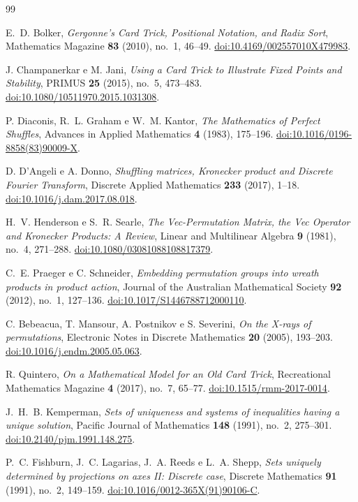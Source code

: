 	\begin{thebibliography}{99}

		E.~D. Bolker,
		\emph{Gergonne's Card Trick, Positional Notation, and Radix Sort},
		Mathematics Magazine \textbf{83} (2010), no.~1, 46--49.
		\href{https://doi.org/10.4169/002557010X479983}{doi:10.4169/002557010X479983}.

		J. Champanerkar e M. Jani,
		\emph{Using a Card Trick to Illustrate Fixed Points and Stability},
		PRIMUS \textbf{25} (2015), no.~5, 473--483.
		\href{https://doi.org/10.1080/10511970.2015.1031308}{doi:10.1080/10511970.2015.1031308}.

		P. Diaconis, R.~L. Graham e W.~M. Kantor,
		\emph{The Mathematics of Perfect Shuffles},
		Advances in Applied Mathematics \textbf{4} (1983), 175--196.
		\href{https://doi.org/10.1016/0196-8858(83)90009-X}{doi:10.1016/0196-8858(83)90009-X}.

		D. D'Angeli e A. Donno,
		\emph{Shuffling matrices, Kronecker product and Discrete Fourier Transform},
		Discrete Applied Mathematics \textbf{233} (2017), 1--18.
		\href{https://doi.org/10.1016/j.dam.2017.08.018}{doi:10.1016/j.dam.2017.08.018}.

		H.~V. Henderson e S.~R. Searle,
		\emph{The Vec-Permutation Matrix, the Vec Operator and Kronecker Products: A Review},
		Linear and Multilinear Algebra \textbf{9} (1981), no.~4, 271--288.
		\href{https://doi.org/10.1080/03081088108817379}{doi:10.1080/03081088108817379}.

		C.~E. Praeger e C. Schneider,
		\emph{Embedding permutation groups into wreath products in product action},
		Journal of the Australian Mathematical Society \textbf{92} (2012),
		no.~1, 127--136.
		\href{https://doi.org/10.1017/S1446788712000110}{doi:10.1017/S1446788712000110}.

		C. Bebeacua, T. Mansour, A. Postnikov e S. Severini,
		\emph{On the X-rays of permutations},
		Electronic Notes in Discrete Mathematics \textbf{20} (2005), 193--203.
		\href{https://doi.org/10.1016/j.endm.2005.05.063}{doi:10.1016/j.endm.2005.05.063}.

		R. Quintero,
		\emph{On a Mathematical Model for an Old Card Trick},
		Recreational Mathematics Magazine \textbf{4} (2017), no.~7, 65--77.
		\href{https://doi.org/10.1515/rmm-2017-0014}{doi:10.1515/rmm-2017-0014}.


		J.~H.~B. Kemperman,
		\emph{Sets of uniqueness and systems of inequalities having a unique solution},
		Pacific Journal of Mathematics \textbf{148} (1991), no.~2, 275--301.
		\href{https://doi.org/10.2140/pjm.1991.148.275}{doi:10.2140/pjm.1991.148.275}.

		P.~C. Fishburn, J.~C. Lagarias, J.~A. Reeds e L.~A. Shepp,
		\emph{Sets uniquely determined by projections on axes II: Discrete case},
		Discrete Mathematics \textbf{91} (1991), no.~2, 149--159.
		\href{https://doi.org/10.1016/0012-365X(91)90106-C}{doi:10.1016/0012-365X(91)90106-C}.

	\end{thebibliography}
